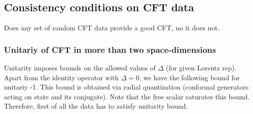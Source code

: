 \subsection{Consistency conditions on CFT data}
 Does any set of random CFT data provide a good CFT, no it does not.
 \subsubsection{Unitariy of CFT in more than two space-dimensions}
 	Unitarity imposes bounds on the allowed values of $\Delta$ (for given Lorentz rep). Apart from the identity operator with $\Delta =0$, we have the following bound for unitariy 
 	\be 
 	\Delta \geq {}-1.
 	\ee 
 	This bound is obtained via radial quantization (conformal generators acting on state and its conjugate). Note that the free scalar saturates this bound.
 	Therefore, first of all the data has to satisfy unitarity bound.
 	
